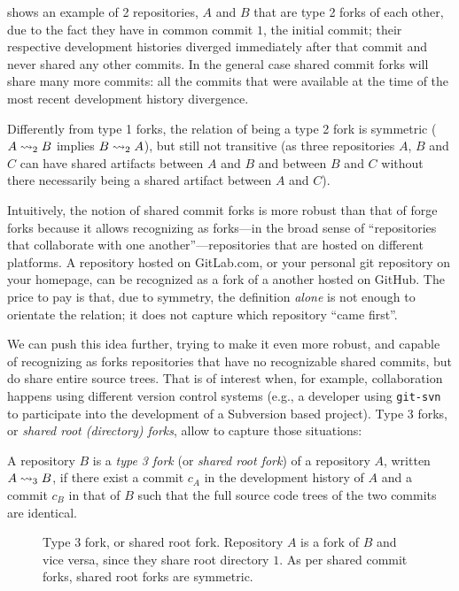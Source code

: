  shows an example of 2 repositories, $A$ and $B$ that
are type 2 forks of each other, due to the fact they have in common commit $1$,
the initial commit; their respective development histories diverged immediately
after that commit and never shared any other commits. In the general case
shared commit forks will share many more commits: all the commits that were
available at the time of the most recent development history divergence.

Differently from type 1 forks, the relation of being a type 2 fork is
symmetric ($A\rightsquigarrow_2 B$ implies $B\rightsquigarrow_2 A$), but still not transitive (as
three repositories $A$, $B$ and $C$ can have shared artifacts between $A$ and
$B$ and between $B$ and $C$ without there necessarily being a shared artifact
between $A$ and $C$).

Intuitively, the notion of shared commit forks is more robust than that of
forge forks because it allows recognizing as forks---in the broad sense of
``repositories that collaborate with one another''---repositories that are
hosted on different platforms. A repository hosted on GitLab.com, or your
personal git repository on your homepage, can be recognized as a fork of a
another hosted on GitHub. The price to pay is that, due to symmetry, the
definition \emph{alone} is not enough to orientate the relation; it does not
capture which repository ``came first''.

We can push this idea further, trying to make it even more robust, and capable
of recognizing as forks repositories that have no recognizable shared commits,
but do share entire source trees. That is of interest when, for example,
collaboration happens using different version control systems (e.g., a
developer using \texttt{git-svn} to participate into the development of a
Subversion based project). Type 3 forks, or \emph{shared root (directory)
forks}, allow to capture those situations:

\begin{definition}%
  \label{def:rootdir-fork}%
  \label{def:type3-fork}
  A repository $B$ is a \emph{type 3 fork} (or \emph{shared root fork}) of a
  repository $A$, written $A\rightsquigarrow_3 B$, if there exist a commit $c_A$ in the
  development history of $A$ and a commit $c_B$ in that of $B$ such that the
  full source code trees of the two commits are identical.
\end{definition}

\begin{figure}[t]
  \centering
  
  \caption{Type 3 fork, or shared root fork. Repository $A$ is a fork of $B$
    and vice versa, since they share root directory $1$.  As per shared commit
    forks, shared root forks are symmetric.}%
  \label{fig:rootdir-fork}%
  \label{fig:type3-fork}
\end{figure}

